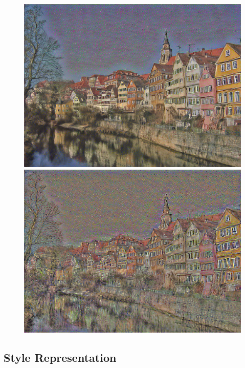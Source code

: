 \documentclass{article}
\begin{document}
\begin{figure}[htp]
    \begin{minipage}{0.3\linewidth}
    \includegraphics[width=\textwidth]{img/content/block4_conv1}
    \end{minipage}
    \begin{minipage}{0.3\linewidth}
    \includegraphics[width=\textwidth]{img/content/block5_conv1}
    \end{minipage}

\end{figure}



\subsection{Style Representation}
\end{document}
